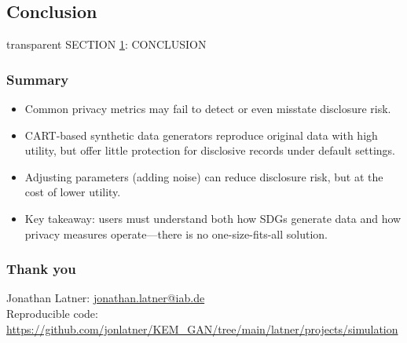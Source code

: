 \documentclass[t,8pt,utfx8]{beamer}
\begin{document}
\begin{spacing}{1.25}
\section{Conclusion}\label{sec:conclusion}
\begin{frame}[c,plain]
\vskip-4mm
\begin{beamercolorbox}[wd=\boxwidth,ht=22.11mm]{transparent}%
    \vfill%
    \leftinsert%
    \MakeUppercase{Section \ref{sec:conclusion}: Conclusion} %
\end{beamercolorbox}
\vskip-3mm
\end{frame}

\begin{frame}[t]\frametitle{Summary}

\begin{itemize}
    \item Common privacy metrics may fail to detect or even misstate disclosure risk.  
    \item CART-based synthetic data generators reproduce original data with high utility, but offer little protection for disclosive records under default settings.  
    \item Adjusting parameters (adding noise) can reduce disclosure risk, but at the cost of lower utility.  
    \item Key takeaway: users must understand both how SDGs generate data and how privacy measures operate—there is no one-size-fits-all solution.  
\end{itemize}

\end{frame}

\begin{frame}[t]\frametitle{Thank you}

Jonathan Latner: \url{jonathan.latner@iab.de} \\

Reproducible code: \url{https://github.com/jonlatner/KEM\_GAN/tree/main/latner/projects/simulation} 


\end{frame}

\end{spacing}
\end{document}

